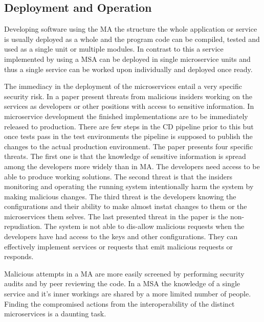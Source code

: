 \subsection{Deployment and Operation}
\begin{sloppypar}
    Developing software using the MA the structure the whole application or service 
    is usually deployed as a whole and the program code can be compiled, tested 
    and used as a single unit or multiple modules. In contrast to this a service 
    implemented by using a MSA can be deployed in single microservice units and 
    thus a single service can be worked upon individually and deployed once ready.
\end{sloppypar}
\begin{sloppypar}
    The immediacy in the deployment of the microservices entail a very specific 
    security risk. In a paper \citet{integinside} present threats from malicious 
    insiders working on the services as developers or other positions with access
    to sensitive information. In microservice development the finished 
    implementations are to be immediately released to production. There are few 
    steps in the CD pipeline prior to this but once tests pass in the test 
    environments the pipeline is supposed to publish the changes to the actual 
    production environment. The paper presents four specific threats. The first 
    one is that the knowledge of sensitive information is spread among the 
    developers more widely than in MA. The developers need access to be able to 
    produce working solutions. The second threat is that the insiders 
    monitoring and operating the running system intentionally harm the system 
    by making malicious changes. The third threat is the developers knowing the 
    configurations and their ability to make almost instat changes to them or 
    the microservices them selves. The last presented threat in the paper is the 
    non-repudiation. The system is not able to dis-allow malicious requests 
    when the developers have had access to the keys and other configurations. 
    They can effectively implement services or requests that emit malicious 
    requests or responds.
\end{sloppypar}
\begin{sloppypar}
    Malicious attempts in a MA are more easily screened by performing security
    audits and by peer reviewing the code. In a MSA the knowledge of a single 
    service and it's inner workings are shared by a more limited number of people.
    Finding the compromised actions from the interoperability of the distinct 
    microservices is a daunting task.
\end{sloppypar}
\begin{sloppypar}
    
\end{sloppypar}



